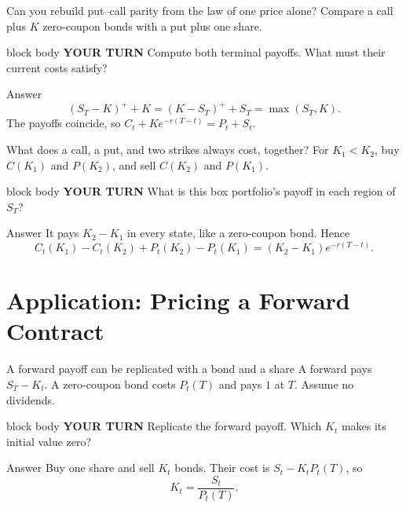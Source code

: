 \documentclass[handout,10pt,aspectratio=169]{beamer}
\newenvironment{pausebox}{\begin{beamercolorbox}[rounded=true,sep=0.8em,wd=\textwidth]{block body}
  \textbf{\color{CourseGold}YOUR TURN}\quad}{\end{beamercolorbox}}
\newcommand{\1}{\mathbf 1}
\begin{document}
\begin{frame}{Can you rebuild put--call parity from the law of one price alone?}
Compare a call plus \(K\) zero-coupon bonds with a put plus one share.
\begin{pausebox}
Compute both terminal payoffs. What must their current costs satisfy?
\end{pausebox}

\begin{exampleblock}{Answer}
\[
(S_T-K)^++K=(K-S_T)^++S_T=\max(S_T,K).
\]
The payoffs coincide, so \(\boxed{C_t+Ke^{-r(T-t)}=P_t+S_t}\).
\end{exampleblock}
\end{frame}



\begin{frame}{What does a call, a put, and two strikes always cost, together?}
For \(K_1<K_2\), buy \(C(K_1)\) and \(P(K_2)\), and sell \(C(K_2)\)
and \(P(K_1)\).
\begin{pausebox}
What is this box portfolio's payoff in each region of \(S_T\)?
\end{pausebox}

\begin{exampleblock}{Answer}
It pays \(K_2-K_1\) in every state, like a zero-coupon bond. Hence
\[
\boxed{C_t(K_1)-C_t(K_2)+P_t(K_2)-P_t(K_1)
=(K_2-K_1)e^{-r(T-t)}.}
\]
\end{exampleblock}
\end{frame}



\section{Application: Pricing a Forward Contract}

\begin{frame}{A forward payoff can be replicated with a bond and a share}
A forward pays \(S_T-K_t\). A zero-coupon bond costs \(P_t(T)\) and pays
\(1\) at \(T\). Assume no dividends.
\begin{pausebox}
Replicate the forward payoff. Which \(K_t\) makes its initial value zero?
\end{pausebox}

\begin{exampleblock}{Answer}
Buy one share and sell \(K_t\) bonds. Their cost is
\(S_t-K_tP_t(T)\), so
\[\boxed{K_t=\frac{S_t}{P_t(T)}.}\]
\end{exampleblock}
\end{frame}
\end{document}
